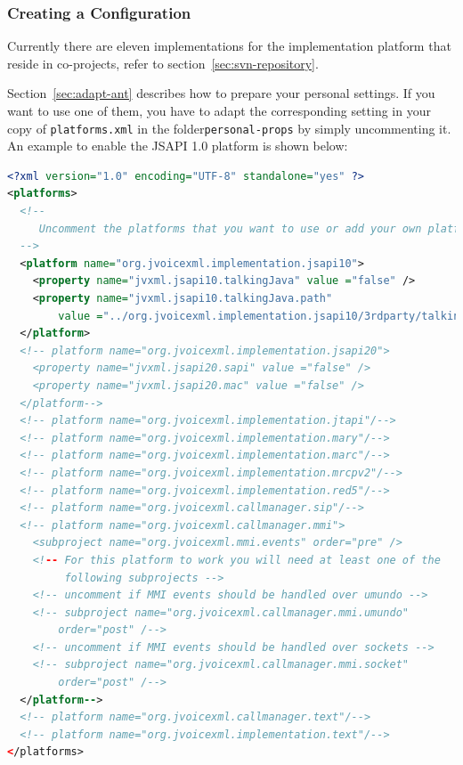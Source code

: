\documentclass[11pt,a4paper]{article}
\begin{document}
\subsubsection{Creating a Configuration}
\label{sec:create-configuration}

Currently there are eleven implementations for the implementation platform
that reside in co-projects, refer to section~\ref{sec:svn-repository}.

Section~\ref{sec:adapt-ant} describes how to prepare your personal settings.
If you want to use one of them, you have to adapt the corresponding setting in
your copy of \texttt{platforms.xml} in the folder\texttt{personal-props} by
simply uncommenting it.
An example to enable the JSAPI 1.0 platform is shown below:
\begin{lstlisting}[language=XML]
<?xml version="1.0" encoding="UTF-8" standalone="yes" ?>
<platforms>
  <!--
     Uncomment the platforms that you want to use or add your own platform.
  -->
  <platform name="org.jvoicexml.implementation.jsapi10">
    <property name="jvxml.jsapi10.talkingJava" value ="false" />
    <property name="jvxml.jsapi10.talkingJava.path"
        value ="../org.jvoicexml.implementation.jsapi10/3rdparty/talkingjava/lib" />
  </platform>
  <!-- platform name="org.jvoicexml.implementation.jsapi20">
    <property name="jvxml.jsapi20.sapi" value ="false" />
    <property name="jvxml.jsapi20.mac" value ="false" />
  </platform-->
  <!-- platform name="org.jvoicexml.implementation.jtapi"/-->
  <!-- platform name="org.jvoicexml.implementation.mary"/-->
  <!-- platform name="org.jvoicexml.implementation.marc"/-->
  <!-- platform name="org.jvoicexml.implementation.mrcpv2"/-->
  <!-- platform name="org.jvoicexml.implementation.red5"/-->
  <!-- platform name="org.jvoicexml.callmanager.sip"/-->
  <!-- platform name="org.jvoicexml.callmanager.mmi">
    <subproject name="org.jvoicexml.mmi.events" order="pre" />
    <!-- For this platform to work you will need at least one of the
         following subprojects -->
    <!-- uncomment if MMI events should be handled over umundo -->
    <!-- subproject name="org.jvoicexml.callmanager.mmi.umundo"
        order="post" /-->
    <!-- uncomment if MMI events should be handled over sockets -->
    <!-- subproject name="org.jvoicexml.callmanager.mmi.socket"
        order="post" /-->
  </platform-->
  <!-- platform name="org.jvoicexml.callmanager.text"/-->
  <!-- platform name="org.jvoicexml.implementation.text"/-->
</platforms>
\end{lstlisting}
\end{document}

